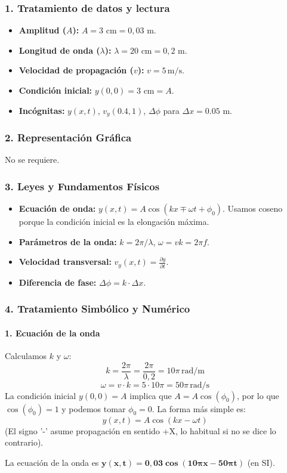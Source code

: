 \subsubsection*{1. Tratamiento de datos y lectura}
\begin{itemize}
    \item \textbf{Amplitud ($A$):} $A = 3 \text{ cm} = 0,03 \text{ m}$.
    \item \textbf{Longitud de onda ($\lambda$):} $\lambda = 20 \text{ cm} = 0,2 \text{ m}$.
    \item \textbf{Velocidad de propagación ($v$):} $v = 5 \, \text{m/s}$.
    \item \textbf{Condición inicial:} $y(0,0) = 3 \text{ cm} = A$.
    \item \textbf{Incógnitas:} $y(x,t)$, $v_y(0.4, 1)$, $\Delta\phi$ para $\Delta x=0.05$ m.
\end{itemize}

\subsubsection*{2. Representación Gráfica}
No se requiere.

\subsubsection*{3. Leyes y Fundamentos Físicos}
\begin{itemize}
    \item \textbf{Ecuación de onda:} $y(x,t) = A\cos(kx \mp \omega t + \phi_0)$. Usamos coseno porque la condición inicial es la elongación máxima.
    \item \textbf{Parámetros de la onda:} $k = 2\pi/\lambda$, $\omega = vk = 2\pi f$.
    \item \textbf{Velocidad transversal:} $v_y(x,t) = \frac{\partial y}{\partial t}$.
    \item \textbf{Diferencia de fase:} $\Delta\phi = k \cdot \Delta x$.
\end{itemize}

\subsubsection*{4. Tratamiento Simbólico y Numérico}
\paragraph*{1. Ecuación de la onda}
Calculamos $k$ y $\omega$:
$$k = \frac{2\pi}{\lambda} = \frac{2\pi}{0,2} = 10\pi \, \text{rad/m}$$
$$\omega = v \cdot k = 5 \cdot 10\pi = 50\pi \, \text{rad/s}$$
La condición inicial $y(0,0)=A$ implica que $A = A\cos(\phi_0)$, por lo que $\cos(\phi_0)=1$ y podemos tomar $\phi_0=0$. La forma más simple es:
$$y(x,t) = A\cos(kx - \omega t)$$
(El signo '-' asume propagación en sentido +X, lo habitual si no se dice lo contrario).
\begin{cajaresultado}
    La ecuación de la onda es $\boldsymbol{y(x,t) = 0,03\cos(10\pi x - 50\pi t)}$ (en SI).
\end{cajaresultado}

